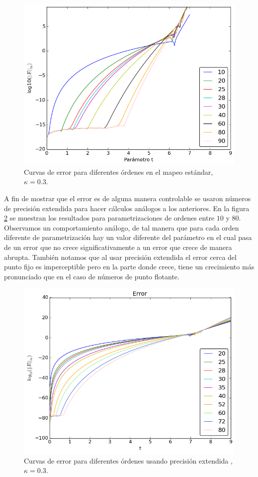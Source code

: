 \begin{figure}[H]
\centering
\includegraphics[scale=0.6]{error_estandar_orden}
\caption{Curvas de error para diferentes órdenes en el mapeo estándar, $\kappa=0.3$. }
\label{erroresf64}
\end{figure}
A fin de mostrar que el error es de alguna manera controlable se usaron números de precisión extendida para hacer cálculos análogos a los anteriores. En la figura \ref{erroresBig} se muestran los resultados para parametrizaciones de ordenes entre $10$ y $80$. Observamos un comportamiento análogo, de tal manera que para cada orden diferente de parametrización hay un valor diferente del parámetro en el cual pasa de un error que no crece significativamente a un error que crece de manera abrupta. También notamos que al usar precisión extendida el error cerca del punto fijo es imperceptible pero en la parte donde crece, tiene un crecimiento más pronunciado que en el caso de números de punto flotante. 

\begin{figure}[H]
\centering
\includegraphics[scale=0.6]{error_estandar_orden_big}
\caption{Curvas de error para diferentes órdenes usando precisión extendida ,$\kappa=0.3$. }
\label{erroresBig}
\end{figure}

